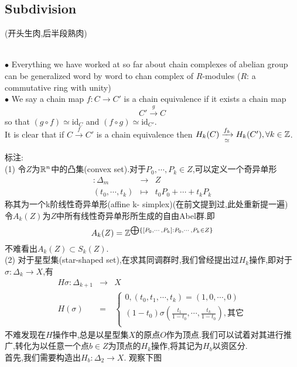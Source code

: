 \documentclass{article}
\begin{document}
\subsection{Subdivision}(开头生肉,后半段熟肉)
\begin{remark}
    \quad \\
    $\bullet$ Everything we have worked at so far about chain complexes of abelian group can be generalized word by word to chan complex of $R$-modules ($R$: a commutative ring with unity)\\
    $\bullet$ We say a chain map $f : C \to C'$ is a chain equivalence if it exists a chain map
    $$
    C' \xrightarrow{g} C
    $$
    so that $(g \circ f)\simeq \text{id}_{C}$ and $(f \circ g) \simeq \text{id}_{C'}$.\\
    It is clear that if $C\xrightarrow{f} C'$ is a chain equivalence then $H_k(C) \xrightarrow[\simeq]{f_k} H_k(C'),\forall k \in \mathbb{Z}$.
\end{remark}
标注:\\
(1) 令$Z$为$\mathbb{R}^n$中的凸集(convex set).对于$P_0,\cdots,P_k\in Z$,可以定义一个奇异单形
\begin{eqnarray*}
    [P_0,\cdots,P_k]: \Delta_m &\to& Z\\
    (t_0,\cdots,t_k) &\mapsto& t_0P_0+\cdots+t_kP_k
\end{eqnarray*}
称其为一个k阶线性奇异单形(affine k- simplex)(在前文提到过,此处重新提一遍)\\
令$A_k(Z)$为$Z$中所有线性奇异单形所生成的自由Abel群.即
$$
A_k(Z) = \mathbb{Z}^{\bigoplus \{[P_0,\cdots,P_k]:P_0,\cdots,P_k\in Z\}}
$$
不难看出$A_k(Z)\subset S_k(Z)$.\\
(2) 对于星型集(star-shaped set),在求其同调群时,我们曾经提出过$H_k$操作,即对于$\sigma :\Delta_k \to X$,有
\begin{eqnarray*}
    H\sigma : \Delta_{k+1} &\to& X\\
    H(\sigma) &=& \left\{\begin{array}{c} 0,(t_0,t_1,\cdots,t_k) = (1,0,\cdots,0)\\(1-t_0)\sigma(\frac{t_1}{1-t_0},\cdots,\frac{t_k}{1-t_0}) , \text{其它} \\ \end{array}\right.
\end{eqnarray*}
不难发现在$H$操作中,总是以星型集$X$的原点$O$作为顶点.我们可以试着对其进行推广,转化为以任意一个点$b \in Z$为顶点的$H_k$操作,将其记为$H_b$以资区分.\\
首先,我们需要构造出$H_b : \Delta_2 \to X$.
观察下图
\end{document}
